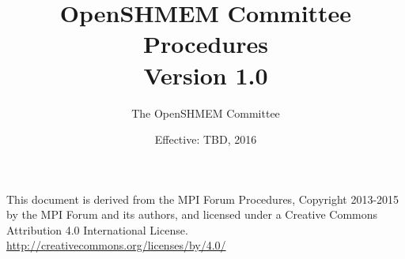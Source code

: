 \documentclass[twoside,fleqn]{book}
\begin{document}
\title{OpenSHMEM Committee Procedures \\
Version 1.0}
\author{The OpenSHMEM Committee}
\date{Effective: TBD, 2016}

\maketitle

\null\vfill
\thispagestyle{empty}
\noindent
This document is derived from the MPI Forum Procedures, Copyright 2013-2015 by
the MPI Forum and its authors, and licensed under a
Creative Commons Attribution 4.0 International
License. \url{http://creativecommons.org/licenses/by/4.0/}







\end{document}
